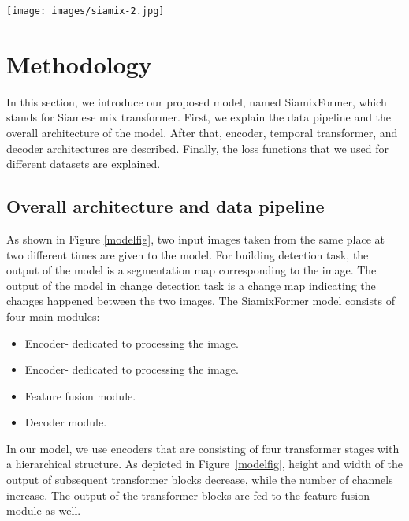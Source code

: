 \documentclass{article}
\newcommand{\RN}[1]{\textup{\uppercase\expandafter{\romannumeral#1}}}
\begin{document}
\begin{figure*}[t]
	\begin{center}
		\texttt{[image: images/siamix-2.jpg]}
		\caption{Overview of the proposed SiamixFormer model that consists of four main modules: two encoders that extract features of  and  input images taken from the same place at two different times; a feature fusion module using a temporal transformer to fuse extracted features considering the temporal feature and their context; and a light-weight decoder. 
			Output of the model for building detection is a segmentation map that indicates the location of buildings in the  input image, and the output for change detection is a change map that highlights the differences between the  and  images.}
		\label{modelfig}
	\end{center}
\end{figure*} 

\section{Methodology}           
\label{sec2}
In this section, we introduce our proposed model, named SiamixFormer, which stands for Siamese mix transformer. First, we explain the data pipeline and the overall architecture of the model. After that, encoder, temporal transformer, and decoder architectures are described. Finally, the loss functions that we used for different datasets are explained.

\subsection{Overall architecture and data pipeline}
As shown in Figure \ref{modelfig}, two input images taken from the same place at two different times are given to the model. For building detection task, the output of the model is a segmentation map corresponding to the  image. The output of the model in change detection task is a change map indicating the changes happened between the two images.  
The SiamixFormer model consists of four main modules:
\begin{itemize}
	\item Encoder-\RN{1} dedicated to processing the  image.
	\item Encoder-\RN{2} dedicated to processing the  image.
	\item Feature fusion module.
	\item Decoder module.
\end{itemize} 
In our model, we use encoders that are consisting of four transformer stages with a hierarchical structure. As depicted in Figure~\ref{modelfig}, height and width of the output of subsequent transformer blocks decrease, while the number of channels increase. The output of the transformer blocks are fed to the feature fusion module as well.
\end{document}
